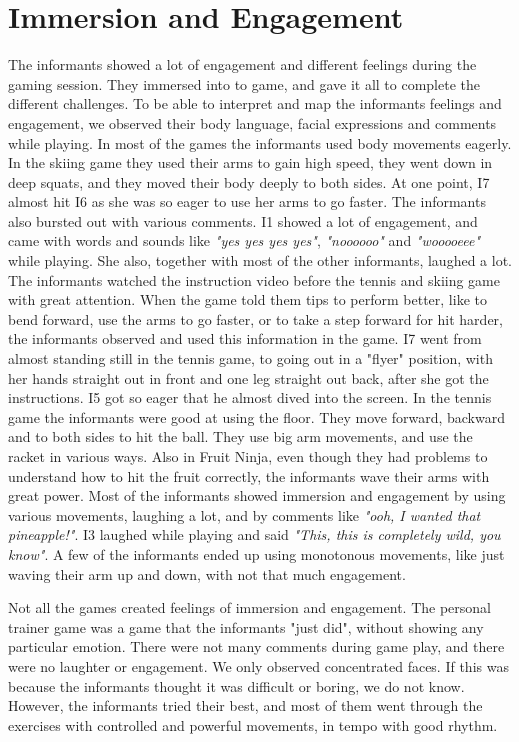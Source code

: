 \section{Immersion and Engagement}
The informants showed a lot of engagement and different feelings during the gaming session. They immersed into to game, and gave it all to complete the different challenges. To be able to interpret and map the informants feelings and engagement, we observed their body language, facial expressions and comments while playing. In most of the games the informants used body movements eagerly. In the skiing game they used their arms to gain high speed, they went down in deep squats, and they moved their body deeply to both sides. At one point, I7 almost hit I6 as she was so eager to use her arms to go faster. The informants also bursted out with various comments. I1 showed a lot of engagement, and came with words and sounds like \emph{"yes yes yes yes"}, \emph{"noooooo"} and \emph{"wooooeee"} while playing. She also, together with most of the other informants, laughed a lot. The informants watched the instruction video before the tennis and skiing game with great attention. When the game told them tips to perform better, like to bend forward, use the arms to go faster, or to take a step forward for hit harder, the informants observed and used this information in the game. I7 went from almost standing still in the tennis game, to going out in a "flyer" position, with her hands straight out in front and one leg straight out back, after she got the instructions. I5 got so eager that he almost dived into the screen. In the tennis game the informants were good at using the floor. They move forward, backward and to both sides to hit the ball. They use big arm movements, and use the racket in various ways. Also in Fruit Ninja, even though they had problems to understand how to hit the fruit correctly, the informants wave their arms with great power. Most of the informants showed immersion and engagement by using various movements, laughing a lot, and by comments like \emph{"ooh, I wanted that pineapple!"}. I3 laughed while playing and said \emph{"This, this is completely wild, you know"}. A few of the informants ended up using monotonous movements, like just waving their arm up and down, with not that much engagement. 

Not all the games created feelings of immersion and engagement. The personal trainer game was a game that the informants "just did", without showing any particular emotion. There were not many comments during game play, and there were no laughter or engagement. We only observed concentrated faces. If this was because the informants thought it was difficult or boring, we do not know. However, the informants tried their best, and most of them went through the exercises with controlled and powerful movements, in tempo with good rhythm.       

